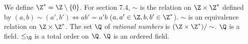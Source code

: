  We define $\Z^* = \Z \setminus \{ 0 \}$. For section 7.4, $\sim$ is the relation on $\Z \times \Z^*$ defined by $(a, b) \sim (a', b') \iff ab' = a'b$ ($a, a' \in \Z, b, b' \in \Z^*$).
 $\sim$ is an equivalence relation on $\Z \times \Z^*$.
 The set $\Q$ of \textit{rational numbers} is $(\Z \times \Z^*) / \sim$.
 $\Q$ is a field.
 $\leq_{\Q}$ is a total order on $\Q$.
 $\Q$ is an ordered field.
